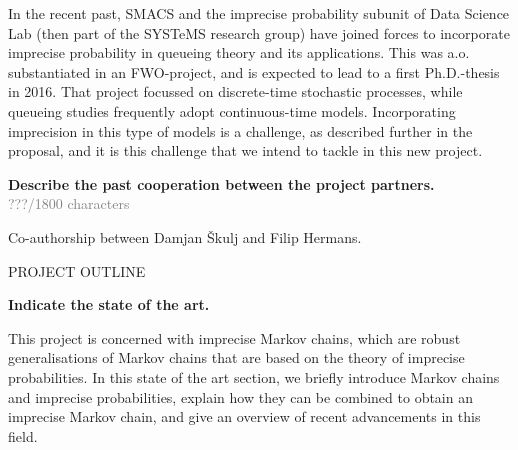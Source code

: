 \documentclass[11pt,dvipsnames,usenames,a4paper]{article}
\begin{document}
In the recent past, SMACS and the imprecise probability subunit of Data Science Lab (then part of the SYSTeMS research group) have  joined forces to incorporate imprecise probability in queueing theory and its applications. This was a.o. substantiated in an FWO-project, and is expected to lead to a first Ph.D.-thesis in 2016. That project focussed on discrete-time stochastic processes, while queueing studies frequently adopt continuous-time models. Incorporating imprecision in this type of models is a challenge, as described further in the proposal, and it is this challenge that we intend to tackle in this new project.

\textbf{Describe the past cooperation between the project partners.}\\
\textcolor{Gray}{???/1800 characters}

Co-authorship between Damjan Škulj and Filip Hermans.






\newpage
{}

\setcounter{page}{1}

\begin{shaded}\centering PROJECT OUTLINE \end{shaded}

\textbf{Indicate the state of the art.}

This project is concerned with imprecise Markov chains, which are robust generalisations of Markov chains that are based on the theory of imprecise probabilities. In this state of the art section, we briefly introduce Markov chains and imprecise probabilities, explain how they can be combined to obtain an imprecise Markov chain, and give an overview of recent advancements in this field.
\end{document}
